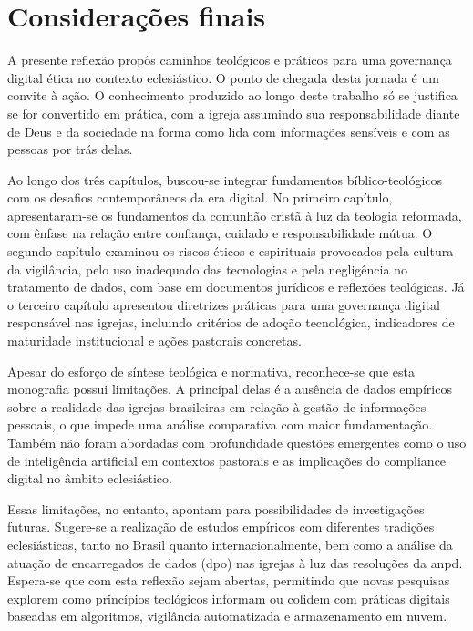 \newpage
\newcommand{\tituloConsideracoesFinais}{Considerações finais}

\chapter*{\tituloConsideracoesFinais}
\addcontentsline{toc}{section}{\MakeUppercase{\tituloConsideracoesFinais}}

A presente reflexão propôs caminhos teológicos e práticos para uma governança digital ética no contexto eclesiástico. O ponto de chegada desta jornada é um convite à ação. O conhecimento produzido ao longo deste trabalho só se justifica se for convertido em prática, com a igreja assumindo sua responsabilidade diante de Deus e da sociedade na forma como lida com informações sensíveis e com as pessoas por trás delas.

Ao longo dos três capítulos, buscou-se integrar fundamentos bíblico-teológicos com os desafios contemporâneos da era digital. No primeiro capítulo, apresentaram-se os fundamentos da comunhão cristã à luz da teologia reformada, com ênfase na relação entre confiança, cuidado e responsabilidade mútua. O segundo capítulo examinou os riscos éticos e espirituais provocados pela cultura da vigilância, pelo uso inadequado das tecnologias e pela negligência no tratamento de dados, com base em documentos jurídicos e reflexões teológicas. Já o terceiro capítulo apresentou diretrizes práticas para uma governança digital responsável nas igrejas, incluindo critérios de adoção tecnológica, indicadores de maturidade institucional e ações pastorais concretas.

Apesar do esforço de síntese teológica e normativa, reconhece-se que esta monografia possui limitações. A principal delas é a ausência de dados empíricos sobre a realidade das igrejas brasileiras em relação à gestão de informações pessoais, o que impede uma análise comparativa com maior fundamentação. Também não foram abordadas com profundidade questões emergentes como o uso de inteligência artificial em contextos pastorais e as implicações do compliance digital no âmbito eclesiástico.

Essas limitações, no entanto, apontam para possibilidades de investigações futuras. Sugere-se a realização de estudos empíricos com diferentes tradições eclesiásticas, tanto no Brasil quanto internacionalmente, bem como a análise da atuação de encarregados de dados (\gls{dpo}) nas igrejas à luz das resoluções da \gls{anpd}. Espera-se que com esta reflexão sejam abertas, permitindo que novas pesquisas explorem como princípios teológicos informam ou colidem com práticas digitais baseadas em algoritmos, vigilância automatizada e armazenamento em nuvem.

